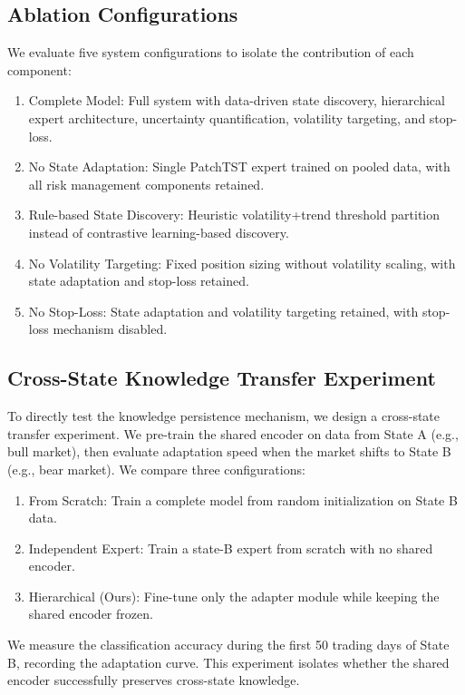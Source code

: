 \documentclass[review]{elsarticle}
\begin{document}
\subsection{Ablation Configurations}

We evaluate five system configurations to isolate the contribution of each component:
\begin{enumerate}
\item Complete Model: Full system with data-driven state discovery, hierarchical expert architecture, uncertainty quantification, volatility targeting, and stop-loss.
\item No State Adaptation: Single PatchTST expert trained on pooled data, with all risk management components retained.
\item Rule-based State Discovery: Heuristic volatility+trend threshold partition instead of contrastive learning-based discovery.
\item No Volatility Targeting: Fixed position sizing without volatility scaling, with state adaptation and stop-loss retained.
\item No Stop-Loss: State adaptation and volatility targeting retained, with stop-loss mechanism disabled.
\end{enumerate}

\subsection{Cross-State Knowledge Transfer Experiment}

To directly test the knowledge persistence mechanism, we design a cross-state transfer experiment. We pre-train the shared encoder on data from State A (e.g., bull market), then evaluate adaptation speed when the market shifts to State B (e.g., bear market). We compare three configurations:

\begin{enumerate}
\item From Scratch: Train a complete model from random initialization on State B data.
\item Independent Expert: Train a state-B expert from scratch with no shared encoder.
\item Hierarchical (Ours): Fine-tune only the adapter module while keeping the shared encoder frozen.
\end{enumerate}

We measure the classification accuracy during the first 50 trading days of State B, recording the adaptation curve. This experiment isolates whether the shared encoder successfully preserves cross-state knowledge.
\end{document}
